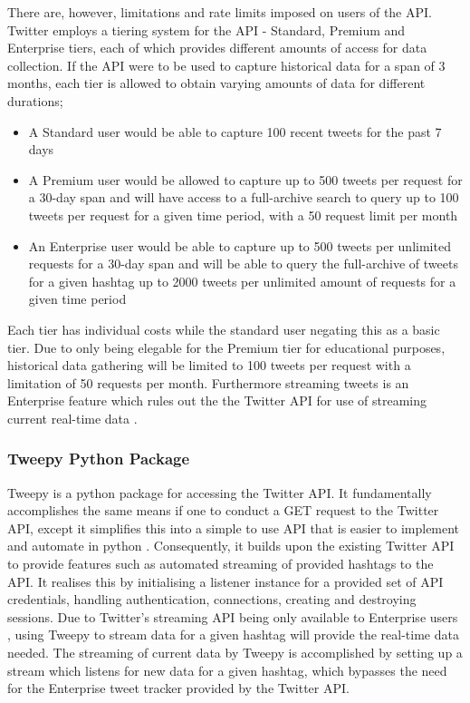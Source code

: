 \documentclass[oneside, 12pt]{article}
\begin{document}
			There are, however, limitations and rate limits imposed on users of the API. Twitter employs a tiering system for the API - Standard, Premium and Enterprise tiers, each of which provides different amounts of access for data collection. If the API were to be used to capture historical data for a span of 3 months, each tier is allowed to obtain varying amounts of data for different durations; \cite{SearchTweets}
			
			\begin{itemize}
				\item A Standard user would be able to capture 100 recent tweets for the past 7 days
				\item A Premium user would be allowed to capture up to 500 tweets per request for a 30-day span and will have access to a full-archive search to query up to 100 tweets per request for a given time period, with a 50 request limit per month
				\item An Enterprise user would be able to capture up to 500 tweets per unlimited requests for a 30-day span and will be able to query the full-archive of tweets for a given hashtag up to 2000 tweets per unlimited amount of requests for a given time period
			\end{itemize}
		
			Each tier has individual costs while the standard user negating this as a basic tier. Due to only being elegable for the Premium tier for educational purposes, historical data gathering will be limited to 100 tweets per request with a limitation of 50 requests per month. Furthermore streaming tweets is an Enterprise feature which rules out the the Twitter API for use of streaming current real-time data \cite{ConStream}.
		
			\subsubsection{Tweepy Python Package}
			Tweepy is a python package for accessing the Twitter API. It fundamentally accomplishes the same means if one to conduct a GET request to the Twitter API, except it simplifies this into a simple to use API that is easier to implement and automate in python \cite{TweepyStream}. Consequently, it builds upon the existing Twitter API to provide features such as automated streaming of provided hashtags to the API. It realises this by initialising a listener instance for a provided set of API credentials, handling authentication, connections, creating and destroying sessions. Due to Twitter's streaming API being only available to Enterprise users \cite{SearchTweets}, using Tweepy to stream data for a given hashtag will provide the real-time data needed. The streaming of current data by Tweepy is accomplished by setting up a stream which listens for new data for a given hashtag, which bypasses the need for the Enterprise tweet tracker provided by the Twitter API.
			
\end{document}
